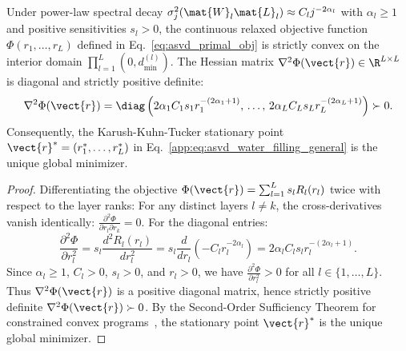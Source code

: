 \begin{lemma}
\label{lem:asvd_convexity}
Under power-law spectral decay $\sigma_j^2(\mat{W}_l \mat{L}_l) \approx C_l j^{-2\alpha_l}$ with $\alpha_l \ge 1$ and positive sensitivities $s_l > 0$, the continuous relaxed objective function $\Phi(r_1, \dots, r_L)$ defined in Eq.~\eqref{eq:asvd_primal_obj} is strictly convex on the interior domain $\prod_{l=1}^L (0, d_{\min}^{(l)})$.
The Hessian matrix $\nabla^2 \Phi(\vect{r}) \in \R^{L \times L}$ is diagonal and strictly positive definite:
\begin{equation}
\nabla^2 \Phi(\vect{r}) = \diag\left( 2\alpha_1 C_1 s_1 r_1^{-(2\alpha_1 + 1)}, \, \dots, \, 2\alpha_L C_L s_L r_L^{-(2\alpha_L + 1)} \right) \succ 0.
\label{eq:asvd_hessian_pd}
\end{equation}
Consequently, the Karush-Kuhn-Tucker stationary point $\vect{r}^* = (r_1^*, \dots, r_L^*)$ in Eq.~\eqref{app:eq:asvd_water_filling_general} is the unique global minimizer.
\end{lemma}

\begin{proof}
Differentiating the objective $\Phi(\vect{r}) = \sum_{l=1}^L s_l R_l(r_l)$ twice with respect to the layer ranks:
For any distinct layers $l \ne k$, the cross-derivatives vanish identically: $\frac{\partial^2 \Phi}{\partial r_l \partial r_k} = 0$.
For the diagonal entries:
\begin{equation}
\frac{\partial^2 \Phi}{\partial r_l^2} = s_l \frac{d^2 R_l(r_l)}{d r_l^2} = s_l \frac{d}{d r_l} \left( -C_l r_l^{-2\alpha_l} \right) = 2\alpha_l C_l s_l r_l^{-(2\alpha_l + 1)}.
\end{equation}
Since $\alpha_l \ge 1$, $C_l > 0$, $s_l > 0$, and $r_l > 0$, we have $\frac{\partial^2 \Phi}{\partial r_l^2} > 0$ for all $l \in \{1, \dots, L\}$.
Thus $\nabla^2 \Phi(\vect{r})$ is a positive diagonal matrix, hence strictly positive definite $\nabla^2 \Phi(\vect{r}) \succ 0$.
By the Second-Order Sufficiency Theorem for constrained convex programs~\cite{nesterov2018lectures}, the stationary point $\vect{r}^*$ is the unique global minimizer.
\end{proof}

